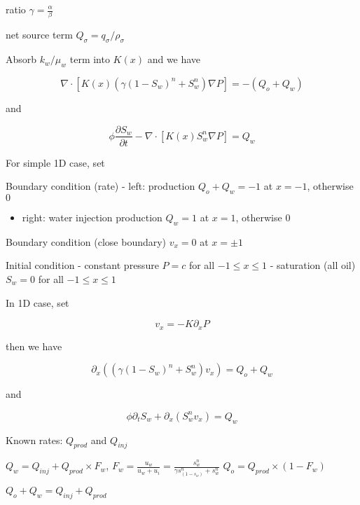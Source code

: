 \documentclass[11pt]{article}
\providecommand{\tightlist}{%
      \setlength{\itemsep}{0pt}\setlength{\parskip}{0pt}}
\begin{document}
ratio \(\gamma = \frac{\alpha}{\beta}\)

net source term \(Q_\sigma = q_\sigma/\rho_\sigma\)

Absorb \(k_w/\mu_w\) term into \(K(x)\) and we have

\[\nabla\cdot[K(x)(\gamma (1-S_w)^n+S_w^n)\nabla P]=-(Q_o+Q_w)\]

and

\[\phi\frac{\partial S_w}{\partial t} - \nabla\cdot[K(x)S_w^n\nabla P] = Q_w\]

For simple 1D case, set

Boundary condition (rate) - left: production \(Q_o+Q_w = -1\) at
\(x=-1\), otherwise \(0\)

\begin{itemize}
\tightlist
\item
  right: water injection production \(Q_w = 1\) at \(x=1\), otherwise
  \(0\)
\end{itemize}

Boundary condition (close boundary) \(v_x = 0\) at \(x=\pm1\)

Initial condition - constant pressure \(P = c\) for all
\(-1\le x \le 1\) - saturation (all oil) \(S_w = 0\) for all
\(-1\le x \le 1\)

In 1D case, set

\[v_x = - K\partial_x P\]

then we have

\[\partial_x((\gamma (1-S_w)^n+S_w^n)v_x)=Q_o+Q_w\]

and

\[\phi\partial_t S_w + \partial_x(S_w^nv_x) = Q_w\]

Known rates: \(Q_{prod}\) and \(Q_{inj}\)

\(Q_w = Q_{inj} + Q_{prod}\times F_w\),
\(F_w = \frac{u_w}{u_w+u_i}=\frac{s_w^n}{\gamma s_(1-s_w)^n+s_w^n}\)
\(Q_o = Q_{prod}\times (1-F_w)\)

\(Q_o+Q_w = Q_{inj}+Q_{prod}\)
\end{document}
